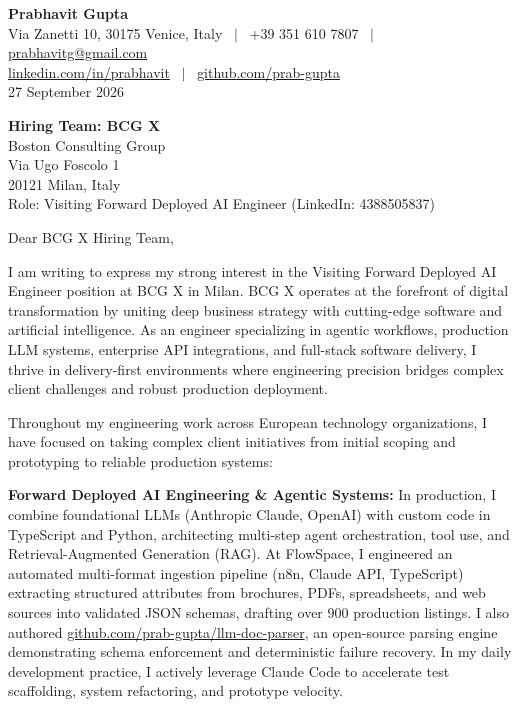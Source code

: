 \documentclass[10.5pt,a4paper]{article}
\begin{document}
\textbf{\large Prabhavit Gupta}\\
Via Zanetti 10, 30175 Venice, Italy ~$\vert$~ +39 351 610 7807 ~$\vert$~ \href{mailto:prabhavitg@gmail.com}{prabhavitg@gmail.com}\\
\href{https://www.linkedin.com/in/prabhavit/}{linkedin.com/in/prabhavit} ~$\vert$~ \href{https://github.com/prab-gupta}{github.com/prab-gupta}\\
27 September 2026

\textbf{Hiring Team: BCG X}\\
Boston Consulting Group\\
Via Ugo Foscolo 1\\
20121 Milan, Italy\\
Role: Visiting Forward Deployed AI Engineer (LinkedIn: 4388505837)

Dear BCG X Hiring Team,

I am writing to express my strong interest in the Visiting Forward Deployed AI Engineer position at BCG X in Milan. BCG X operates at the forefront of digital transformation by uniting deep business strategy with cutting-edge software and artificial intelligence. As an engineer specializing in agentic workflows, production LLM systems, enterprise API integrations, and full-stack software delivery, I thrive in delivery-first environments where engineering precision bridges complex client challenges and robust production deployment.

Throughout my engineering work across European technology organizations, I have focused on taking complex client initiatives from initial scoping and prototyping to reliable production systems:

\textbf{Forward Deployed AI Engineering \& Agentic Systems:} In production, I combine foundational LLMs (Anthropic Claude, OpenAI) with custom code in TypeScript and Python, architecting multi-step agent orchestration, tool use, and Retrieval-Augmented Generation (RAG). At FlowSpace, I engineered an automated multi-format ingestion pipeline (n8n, Claude API, TypeScript) extracting structured attributes from brochures, PDFs, spreadsheets, and web sources into validated JSON schemas, drafting over 900 production listings. I also authored \href{https://github.com/prab-gupta/llm-doc-parser}{github.com/prab-gupta/llm-doc-parser}, an open-source parsing engine demonstrating schema enforcement and deterministic failure recovery. In my daily development practice, I actively leverage Claude Code to accelerate test scaffolding, system refactoring, and prototype velocity.
\end{document}
